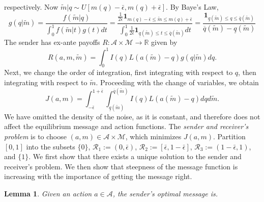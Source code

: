 \documentclass[12pt]{article}
\newtheorem{lemma}{Lemma}
\begin{document}
respectively. Now $\tilde{m}|q\sim U[m(q)-\bar{\epsilon},m(q)+\bar{\epsilon}]$. By Baye's Law,
\begin{equation}
g(q|\tilde{m})=\frac{f(\tilde{m}|q)}{\int_{0}^{1}{f(\tilde{m}|t)g(t)dt}}=\frac{\frac{1}{2\bar{\epsilon}}\mathbf{1}_{m(q)-\bar{\epsilon}\leq\tilde{m}\leq m(q)+\bar{\epsilon}}}{\int_{0}^{1}{\frac{1}{2\bar{\epsilon}}\mathbf{1}_{\underline{q}(\tilde{m})\leq t\leq\overline{q}(\tilde{m})}dt}}=\frac{\mathbf{1}_{\underline{q}(\tilde{m})\leq q\leq\overline{q}(\tilde{m})}}{\overline{q}(\tilde{m})-\underline{q}(\tilde{m})}
\end{equation}
The sender has ex-ante payoffs $R:\mathcal{A}\times\mathcal{M}\rightarrow\mathbb{R}$ given by
\begin{equation}
R(a,m,\tilde{m})=\int_{0}^{1}{I(q)L(a(\tilde{m})-q)g(q|\tilde{m})dq}.
\end{equation}
Next, we change the order of integration, first integrating with respect to $q$, then integrating with respect to $\tilde{m}$. Proceeding with the change of variables, we obtain 
\begin{equation}
J(a,m)=\int_{-\bar{\epsilon}}^{1+\bar{\epsilon}}{\int_{\underline{q}(\tilde{m})}^{\overline{q}(\tilde{m})}{{I(q)L(a(\tilde{m})-q)dq}d\tilde{m}}}.
\end{equation}
We have omitted the density of the noise, as it is constant, and therefore does not affect the equilibrium message and action functions. The \textit{sender and receiver's problem} is to choose $(a,m)\in\mathcal{A}\times\mathcal{M}$, which minimizes $J(a,m)$. Partition $[0,1]$ into the subsets $\{0\}$, $\mathcal{R}_{1}:=(0,\bar{\epsilon})$, $\mathcal{R}_{2}:=[\bar{\epsilon},1-\bar{\epsilon}]$, $\mathcal{R}_{3}:=(1-\bar{\epsilon},1)$, and $\{1\}$. We first show that there exists a unique solution to the sender and receiver's problem. We then show that steepness of the message function is increasing with the importance of getting the message right.
\begin{lemma}\label{lemma:message}
Given an action $a\in\mathcal{A}$, the sender's optimal message is.
\end{lemma}
\end{document}
